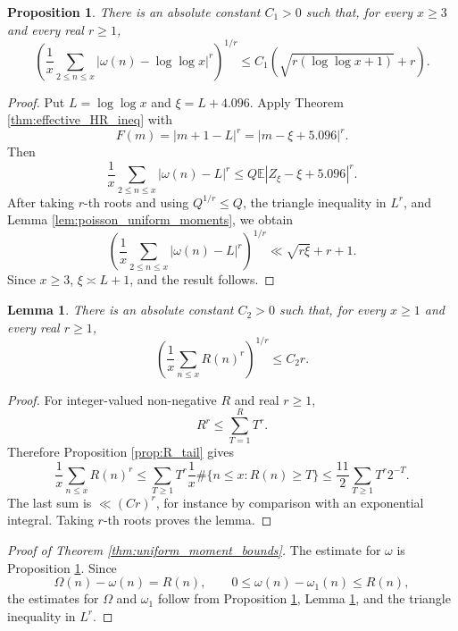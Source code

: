 \documentclass[12pt,a4paper,reqno]{amsart}
\theoremstyle{plain}
\newtheorem{lmm}[thrm]{Lemma}
\newtheorem{prpstn}[thrm]{Proposition}
\numberwithin{sblmm}{thrm}
\numberwithin{equation}{section}
\begin{document}
\begin{prpstn}\label{prop:omega_uniform_moments}
    There is an absolute constant $C_1>0$ such that, for every $x\ge 3$ and every real $r\ge 1$,
    \begin{equation}\label{eqn:omega_uniform_moments}
        \left(\frac{1}{x}\sum_{2\le n\le x}|\omega(n)-\log\log x|^r\right)^{1/r}\le C_1(\sqrt{r(\log\log x+1)}+r).
    \end{equation}
\end{prpstn}
\begin{proof}
    Put $L=\log\log x$ and $\xi=L+4.096$. Apply Theorem \ref{thm:effective_HR_ineq} with
    $$F(m)=|m+1-L|^r=|m-\xi+5.096|^r.$$
    Then
    $$\frac{1}{x}\sum_{2\le n\le x}|\omega(n)-L|^r\le Q\mathbb{E}|Z_{\xi}-\xi+5.096|^r.$$
    After taking $r$-th roots and using $Q^{1/r}\le Q$, the triangle inequality in $L^r$, and Lemma \ref{lem:poisson_uniform_moments}, we obtain
    $$\left(\frac{1}{x}\sum_{2\le n\le x}|\omega(n)-L|^r\right)^{1/r}\ll\sqrt{r\xi}+r+1.$$
    Since $x\ge 3$, $\xi\asymp L+1$, and the result follows.
\end{proof}

\begin{lmm}\label{lem:R_uniform_moments}
    There is an absolute constant $C_2>0$ such that, for every $x\ge 1$ and every real $r\ge 1$,
    \begin{equation}\label{eqn:R_uniform_moments}
        \left(\frac{1}{x}\sum_{n\le x}R(n)^r\right)^{1/r}\le C_2r.
    \end{equation}
\end{lmm}
\begin{proof}
    For integer-valued non-negative $R$ and real $r\ge 1$,
    $$R^r\le\sum_{T=1}^{R}T^r.$$
    Therefore Proposition \ref{prop:R_tail} gives
    $$\frac{1}{x}\sum_{n\le x}R(n)^r\le\sum_{T\ge 1}T^r\frac{1}{x}\#\{n\le x:R(n)\ge T\}\le\frac{11}{2}\sum_{T\ge 1}T^r2^{-T}.$$
    The last sum is $\ll (Cr)^r$, for instance by comparison with an exponential integral. Taking $r$-th roots proves the lemma.
\end{proof}

\begin{proof}[Proof of Theorem \ref{thm:uniform_moment_bounds}]
    The estimate for $\omega$ is Proposition \ref{prop:omega_uniform_moments}. Since
    $$\Omega(n)-\omega(n)=R(n),\qquad 0\le\omega(n)-\omega_1(n)\le R(n),$$
    the estimates for $\Omega$ and $\omega_1$ follow from Proposition \ref{prop:omega_uniform_moments}, Lemma \ref{lem:R_uniform_moments}, and the triangle inequality in $L^r$.
\end{proof}
\end{document}
